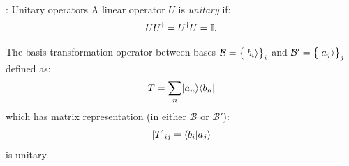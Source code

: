 \begin{defbox}{: Unitary operators}
    A linear operator $U$ is \emph{unitary} if:
    \begin{equation}
        UU^\dagger = U^\dagger U = \mathbb{I}.
    \end{equation}
\end{defbox}
\begin{propbox}{}
    The basis transformation operator between bases $\mathcal{B} = \set{\lvert b_i \rangle}_i$ and $\mathcal{B}' = \set{\lvert a_j \rangle}_j$ defined as:
    \begin{equation}\label{eq-Tbasisagnostic}
        T = \sum_{n} \lvert a_n \rangle \langle b_n \rvert
    \end{equation}
    which has matrix representation (in either $\mathcal{B}$ or $\mathcal{B}'$):
    \begin{equation}\label{eq-Tmatrix}
        [T]_{ij} = \langle b_i \lvert a_j \rangle
    \end{equation}
    is unitary.
\end{propbox}

